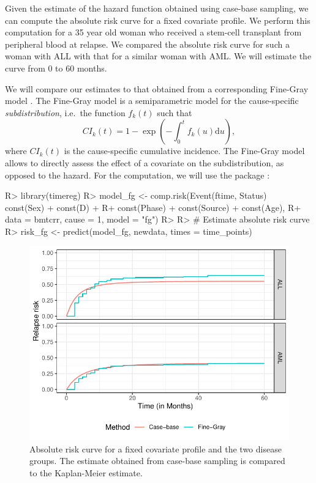 \documentclass[
]{jss}
\begin{document}
Given the estimate of the hazard function obtained using case-base
sampling, we can compute the absolute risk curve for a fixed covariate
profile. We perform this computation for a 35 year old woman who
received a stem-cell transplant from peripheral blood at relapse. We
compared the absolute risk curve for such a woman with ALL with that for
a similar woman with AML. We will estimate the curve from 0 to 60
months.

We will compare our estimates to that obtained from a corresponding
Fine-Gray model \citeyearpar{fine1999proportional}. The Fine-Gray model
is a semiparametric model for the cause-specific \emph{subdistribution},
i.e.~the function \(f_k(t)\) such that
\[CI_k(t) =1 - \exp\left( - \int_0^t f_k(u) \textrm{d}u \right),\] where
\(CI_k(t)\) is the cause-specific cumulative incidence. The Fine-Gray
model allows to directly assess the effect of a covariate on the
subdistribution, as opposed to the hazard. For the computation, we will
use the  package \citep{timereg}:

\begin{CodeChunk}

\begin{CodeInput}
R> library(timereg)
R> model_fg <- comp.risk(Event(ftime, Status) ~ const(Sex) + const(D) +
R+                         const(Phase) + const(Source) + const(Age),
R+                       data = bmtcrr, cause = 1, model = "fg")
R> 
R> # Estimate absolute risk curve
R> risk_fg <- predict(model_fg, newdata, times = time_points)
\end{CodeInput}
\end{CodeChunk}

\begin{CodeChunk}
\begin{figure}

{\centering \includegraphics[width=\textwidth,keepaspectratio=true]{../figures/bmtcrr-risk-1} 

}

\caption{\label{fig:compAbsrisk} Absolute risk curve for a fixed covariate profile and the two disease groups. The estimate obtained from case-base sampling is compared to the Kaplan-Meier estimate.}\label{fig:bmtcrr-risk}
\end{figure}
\end{CodeChunk}
\end{document}
